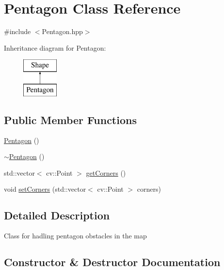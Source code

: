 \hypertarget{class_pentagon}{}\section{Pentagon Class Reference}
\label{class_pentagon}


{\ttfamily \#include $<$Pentagon.\+hpp$>$}

Inheritance diagram for Pentagon\+:\begin{figure}[H]
\begin{center}
\leavevmode
\includegraphics[height=2.000000cm]{class_pentagon}
\end{center}
\end{figure}
\subsection*{Public Member Functions}
\begin{DoxyCompactItemize}
\item 
\mbox{\hyperlink{class_pentagon_a1c5596d8ff548bfcdccc7fa53b81355c}{Pentagon}} ()
\item 
\mbox{\hyperlink{class_pentagon_a500031431177cee506fd7f0517d84753}{$\sim$\+Pentagon}} ()
\item 
std\+::vector$<$ cv\+::\+Point $>$ \mbox{\hyperlink{class_pentagon_ab38482973f796da34cd9ac62cefb1491}{get\+Corners}} ()
\item 
void \mbox{\hyperlink{class_pentagon_a42c8df4cbb1fcf985c96c9886a21c70a}{set\+Corners}} (std\+::vector$<$ cv\+::\+Point $>$ corners)
\end{DoxyCompactItemize}


\subsection{Detailed Description}
Class for hadling pentagon obstacles in the map 

\subsection{Constructor \& Destructor Documentation}
\mbox{\label{class_pentagon_a1c5596d8ff548bfcdccc7fa53b81355c}} 
